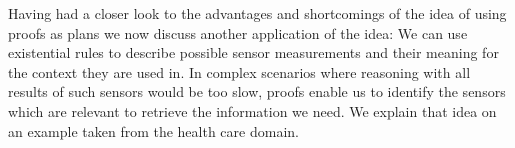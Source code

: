 Having had a closer look to the advantages and shortcomings of the idea of using proofs as plans we now discuss another application of the idea:
We can use existential rules to describe possible sensor measurements and their meaning for the context they are used in.
In complex scenarios where reasoning with all results of such sensors would be too slow, proofs enable us to identify the sensors which are relevant to retrieve the information we need. 
We 
explain that idea on an example taken from the health care domain.


% 

